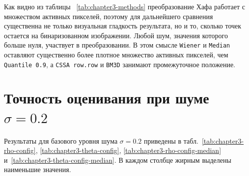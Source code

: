 Как видно из таблицы ~\ref{tab:chapter3-methods} преобразование Хафа работает с множеством активных пикселей, поэтому для
дальнейшего сравнения существенна не только визуальная гладкость результата,
но и то, сколько точек остается на бинаризованном изображении. Любой шум, 
значения которого больше нуля, участвует в преобразовании. 
В этом смысле \texttt{Wiener} и \texttt{Median} оставляют существенно более плотное множество
активных пикселей, чем \texttt{Quantile 0.9}, а \texttt{CSSA row.row} и
\texttt{BM3D} занимают промежуточное положение.

\section{Точность оценивания при шуме $\sigma=0.2$}

Результаты для базового уровня шума $\sigma=0.2$ приведены в
табл.~\ref{tab:chapter3-rho-config},
\ref{tab:chapter3-theta-config},
\ref{tab:chapter3-rho-config-median}
и~\ref{tab:chapter3-theta-config-median}.
В каждом столбце жирным выделены наименьшие значения.

\begin{table}[H]
	\centering
	\caption{Средние ошибки оценивания параметра $\rho$ по конфигурациям прямой}
	\label{tab:chapter3-rho-config}
\end{table}

